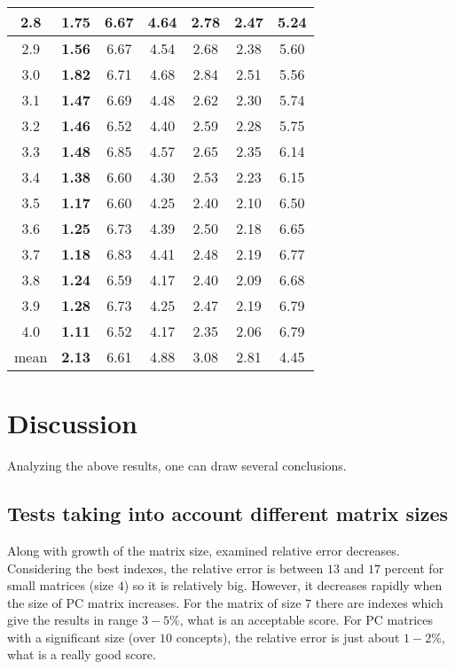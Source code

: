 \begin{table}[h]
\begin{center}
\begin{tabular}{|c||c|c|c|c|c|c|}
2.8 & \textbf{1.75} & 6.67 & 4.64 & 2.78 & 2.47 & 5.24 \\ \hline
2.9 & \textbf{1.56} & 6.67 & 4.54 & 2.68 & 2.38 & 5.60 \\ \hline
3.0 & \textbf{1.82} & 6.71 & 4.68 & 2.84 & 2.51 & 5.56 \\ \hline
3.1 & \textbf{1.47} & 6.69 & 4.48 & 2.62 & 2.30 & 5.74 \\ \hline
3.2 & \textbf{1.46} & 6.52 & 4.40 & 2.59 & 2.28 & 5.75 \\ \hline
3.3 & \textbf{1.48} & 6.85 & 4.57 & 2.65 & 2.35 & 6.14 \\ \hline
3.4 & \textbf{1.38} & 6.60 & 4.30 & 2.53 & 2.23 & 6.15 \\ \hline
3.5 & \textbf{1.17} & 6.60 & 4.25 & 2.40 & 2.10 & 6.50 \\ \hline
3.6 & \textbf{1.25} & 6.73 & 4.39 & 2.50 & 2.18 & 6.65 \\ \hline
3.7 & \textbf{1.18} & 6.83 & 4.41 & 2.48 & 2.19 & 6.77 \\ \hline
3.8 & \textbf{1.24} & 6.59 & 4.17 & 2.40 & 2.09 & 6.68 \\ \hline
3.9 & \textbf{1.28} & 6.73 & 4.25 & 2.47 & 2.19 & 6.79 \\ \hline
4.0 & \textbf{1.11} & 6.52 & 4.17 & 2.35 & 2.06 & 6.79 \\ \hline \hline
mean & \textbf{2.13} & 6.61 & 4.88 & 3.08 & 2.81 & 4.45 \\ \hline 
\end{tabular}
\end{center}
\end{table}


\section{Discussion}
Analyzing the above results, one can draw several conclusions.

\subsection{Tests taking into account different matrix sizes}
Along with growth of the matrix size, examined relative error decreases. Considering the best indexes, the relative error is between $13$ and $17$ percent for small matrices (size $4$) so it is relatively big. However, it decreases rapidly when the size of PC matrix increases. For the matrix of size $7$ there are indexes which give the results in range $3 - 5 \%$, what is an acceptable score. For PC matrices with a significant size (over $10$ concepts), the relative error is just about $1 - 2 \%$, what is a really good score.

